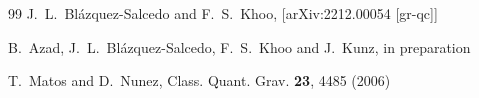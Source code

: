 \documentclass[twocolumn,showpacs,preprintnumbers,amsmath,amssymb,floatfix]{revtex4-1}
\begin{document}
\begin{thebibliography}{99}
J.~L.~Bl\'azquez-Salcedo and F.~S.~Khoo,
[arXiv:2212.00054 [gr-qc]]

B.~Azad, J.~L.~Bl\'azquez-Salcedo, F.~S.~Khoo and J.~Kunz,
in preparation

T.~Matos and D.~Nunez,
Class. Quant. Grav. \textbf{23}, 4485 (2006)

\end{thebibliography}


\end{document}
